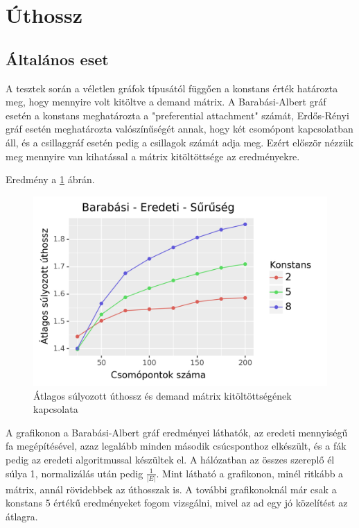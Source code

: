 \documentclass[12pt]{report}
\begin{document}
\section{Úthossz}

\subsection{Általános eset}

A tesztek során a véletlen gráfok típusától függően a konstans érték határozta meg, hogy mennyire volt kitöltve a demand mátrix.
A Barabási-Albert gráf esetén a konstans meghatározta a "preferential attachment" számát, Erdős-Rényi gráf esetén meghatározta valószínűségét annak, hogy két csomópont kapcsolatban áll, és a csillaggráf esetén pedig a csillagok számát adja meg. 
Ezért először nézzük meg mennyire van kihatással a mátrix kitöltöttsége az eredményekre.

Eredmény a \ref{density-len} ábrán.

\begin{figure}[H]
	\begin{center}
		\includegraphics[width=0.9\linewidth]{pictures/density_len.png}
		\caption{Átlagos súlyozott úthossz és demand mátrix kitöltöttségének kapcsolata}
		\label{density-len}
	\end{center}
\end{figure}

A grafikonon a Barabási-Albert gráf eredményei láthatók, az eredeti mennyiségű fa megépítésével, azaz legalább minden második csúcsponthoz elkészült, és a fák pedig az eredeti algoritmussal készültek el.
A hálózatban az összes szereplő él súlya 1, normalizálás után pedig
\(\frac{1}{|E|}\).
Mint látható a grafikonon, minél ritkább a mátrix, annál rövidebbek az úthosszak is.
A további grafikonoknál már csak a konstans 5 értékű eredményeket fogom vizsgálni, mivel az ad egy jó közelítést az átlagra.
\end{document}
